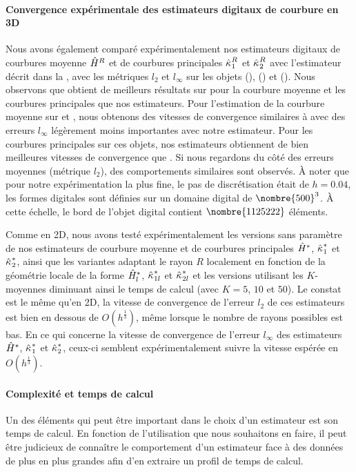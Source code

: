 \paragraph{Convergence expérimentale des estimateurs digitaux de courbure en 3D}
%
Nous avons également comparé expérimentalement nos estimateurs digitaux de
courbures moyenne $\hat{H}^{R}$ et de courbures principales $\hat{\kappa_{}}_{1}^{R}$
et $\hat{\kappa_{}}_{2}^{R}$ avec l'estimateur \JetFitting \cite{Cazals2005} décrit
dans la , avec les métriques $l_2$ et $l_\infty$
sur les objets \Sphere (), \RoundedCube
() et \Goursat
(). Nous observons que \JetFitting
obtient de meilleurs résultats sur \Sphere pour la courbure moyenne et les
courbures principales que nos estimateurs. Pour l'estimation de la courbure
moyenne sur \RoundedCube et \Goursat, nous obtenons des vitesses de convergence
similaires à \JetFitting avec des erreurs $l_\infty$ légèrement moins importantes
avec notre estimateur. Pour les courbures principales sur ces objets, nos
estimateurs obtiennent de bien meilleures vitesses de convergence que
\JetFitting. Si nous regardons du côté des erreurs moyennes (métrique $l_2$),
des comportements similaires sont observés. À noter que pour notre
expérimentation la plus fine, le pas de discrétisation était de $h = 0.04$, les
formes digitales sont définies sur un domaine digital de $\nombre{500}^3$. À cette
échelle, le bord de l'objet digital \RoundedCube contient $\nombre{1125222}$
éléments.


Comme en 2D, nous avons testé expérimentalement les versions sans paramètre de
nos estimateurs de courbure moyenne et de courbures principales $\hat{H}^{*}$,
$\hat{\kappa_{}}_{1}^{*}$ et $\hat{\kappa_{}}_{2}^{*}$, ainsi que les variantes adaptant le
rayon $R$ localement en fonction de la géométrie locale de la forme
$\hat{H}^{*}_{l}$, $\hat{\kappa_{}}_{1l}^{*}$ et $\hat{\kappa_{}}_{2l}^{*}$ et les versions
utilisant les $K$-moyennes diminuant ainsi le temps de calcul (avec $K = 5$,
$10$ et $50$). Le constat est le même qu'en 2D, la vitesse de convergence de
l'erreur $l_2$ de ces estimateurs est bien en dessous de $O(h^\frac{1}{3})$,
même lorsque le nombre de rayons possibles est bas. En ce qui concerne la vitesse
de convergence de l'erreur $l_\infty$ des estimateurs $\hat{H}^{*}$,
$\hat{\kappa_{}}_{1}^{*}$ et $\hat{\kappa_{}}_{2}^{*}$, ceux-ci semblent expérimentalement
suivre la vitesse espérée en $O(h^\frac{1}{3})$.
%
\paragraph{Complexité et temps de calcul}
\label{sec:complexite}
%
Un des éléments qui peut être important dans le choix d'un estimateur est son
temps de calcul. En fonction de l'utilisation que nous souhaitons en faire, il
peut être judicieux de connaître le comportement d'un estimateur face à des
données de plus en plus grandes afin d'en extraire un profil de temps de calcul.


